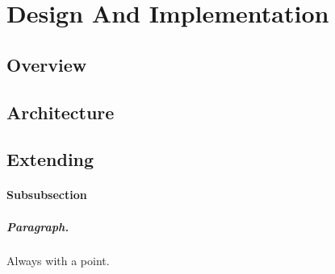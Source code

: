 \chapter{Design And Implementation}
\label{chap:design}
\section{Overview}

\section{Architecture}
\section{Extending}
\subsubsection{Subsubsection}

\paragraph{Paragraph.} Always with a point.


